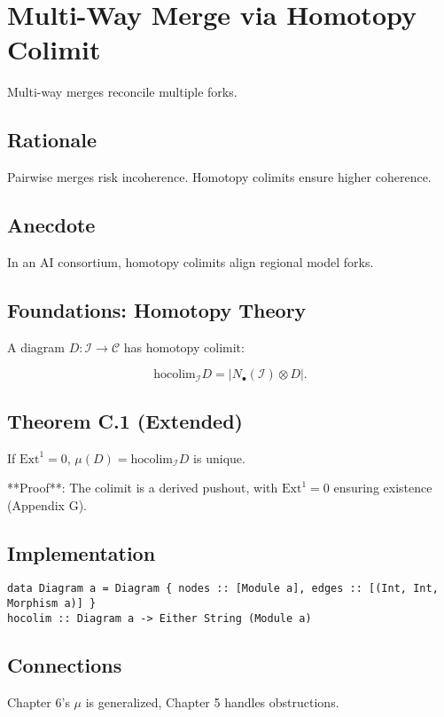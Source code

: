 \documentclass[12pt]{article}
\begin{document}
\section{Multi-Way Merge via Homotopy Colimit}
\label{sec:chapter7}

Multi-way merges reconcile multiple forks.

\subsection{Rationale}
Pairwise merges risk incoherence. Homotopy colimits ensure higher coherence.

\subsection{Anecdote}
In an AI consortium, homotopy colimits align regional model forks.

\subsection{Foundations: Homotopy Theory}
A diagram $D : \mathcal{I} \to \mathcal{C}$ has homotopy colimit:

\[
\mathrm{hocolim}_\mathcal{I} D = \left| N_\bullet(\mathcal{I}) \otimes D \right|.
\]

\subsection{Theorem C.1 (Extended)}
If $\mathrm{Ext}^1 = 0$, $\mu(D) = \mathrm{hocolim}_\mathcal{I} D$ is unique.

**Proof**: The colimit is a derived pushout, with $\mathrm{Ext}^1 = 0$ ensuring existence \cite{lurie2009higher} (Appendix G).

\subsection{Implementation}
\begin{lstlisting}
data Diagram a = Diagram { nodes :: [Module a], edges :: [(Int, Int, Morphism a)] }
hocolim :: Diagram a -> Either String (Module a)
\end{lstlisting}

\subsection{Connections}
Chapter 6’s $\mu$ is generalized, Chapter 5 handles obstructions.
\end{document}
